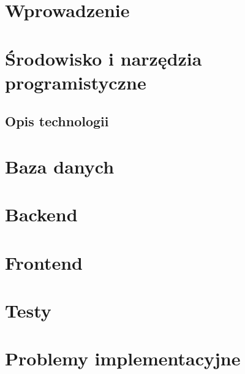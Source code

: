 






\section{Wprowadzenie}
\section{Środowisko i narzędzia programistyczne}
\subsection{Opis technologii}
\section{Baza danych}
\section{Backend}
\section{Frontend}
\section{Testy}
\section{Problemy implementacyjne}



